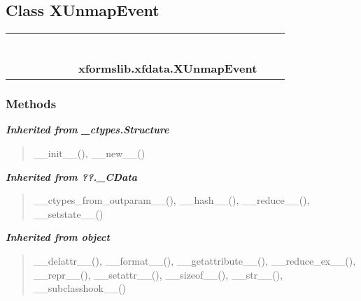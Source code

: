 \subsection{Class XUnmapEvent}

    \label{xformslib:xfdata:XUnmapEvent}
\begin{tabular}{cccccccccc}
\multicolumn{2}{r}{\settowidth{\BCL}{object}\multirow{2}{\BCL}{object}}
&&
&&
&&
  \\\cline{3-3}
  &&\multicolumn{1}{c|}{}
&&
&&
&&
  \\
\multicolumn{4}{r}{\settowidth{\BCL}{??.\_CData}\multirow{2}{\BCL}{??.\_CData}}
&&
&&
  \\\cline{5-5}
  &&&&\multicolumn{1}{c|}{}
&&
&&
  \\
\multicolumn{6}{r}{\settowidth{\BCL}{\_ctypes.Structure}\multirow{2}{\BCL}{\_ctypes.Structure}}
&&
  \\\cline{7-7}
  &&&&&&\multicolumn{1}{c|}{}
&&
  \\
&&&&&&\multicolumn{2}{l}{\textbf{xformslib.xfdata.XUnmapEvent}}
\end{tabular}



  \subsubsection{Methods}


\large{\textbf{\textit{Inherited from \_ctypes.Structure}}}

\begin{quote}
\_\_init\_\_(), \_\_new\_\_()
\end{quote}

\large{\textbf{\textit{Inherited from ??.\_CData}}}

\begin{quote}
\_\_ctypes\_from\_outparam\_\_(), \_\_hash\_\_(), \_\_reduce\_\_(), \_\_setstate\_\_()
\end{quote}

\large{\textbf{\textit{Inherited from object}}}

\begin{quote}
\_\_delattr\_\_(), \_\_format\_\_(), \_\_getattribute\_\_(), \_\_reduce\_ex\_\_(), \_\_repr\_\_(), \_\_setattr\_\_(), \_\_sizeof\_\_(), \_\_str\_\_(), \_\_subclasshook\_\_()
\end{quote}

